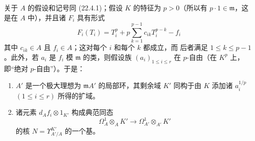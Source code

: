 \begin{proposition}[22.4.4]
\label{0.22.4.4-fr}
关于 $A$ 的假设和记号同 (22.4.1)；假设 $K$ 的特征为 $p>0$（所以有
$p\cdot1\in\mathfrak m$，这是在 $A$ 中），并且诸 $F_i$ 具有形式
\begin{equation}
\label{0.22.4.4.1-fr}
  F_i(T_i)=T_i^p+p\sum_{k=1}^{p-1}c_{ik}T_i^{p-k}-f_i
  \tag{22.4.4.1}
\end{equation}
其中 $c_{ik}\in A$ 且 $f_i\in A$；这对每个 $i$ 和每个 $k$ 都成立，而
后者满足 $1\leqslant k\leqslant p-1$。此外，若 $a_i$ 是 $f_i$ 模
$\mathfrak m$ 的类，则假设族 $(a_i)_{1\leqslant i\leqslant r}$ 在
$p$-自由（在 $K^p$ 上，即“绝对 $p$-自由”）。于是：
\begin{enumerate}
  \item[(i)] $A'$ 是一个极大理想为 $\mathfrak mA'$ 的局部环，其剩余域
  $K'$ 同构于由 $K$ 添加诸 $a_i^{1/p}$
  $(1\leqslant i\leqslant r)$ 所得的扩域。


  \item[(ii)] 诸元素 $d_Af_i\otimes1_{K'}$ 构成典范同态
  \[
    \Omega^1_A\otimes_AK'\longrightarrow
    \Omega^1_{A'}\otimes_{A'}K'
  \]
  的核 $N=\Upsilon^{K'}_{A'/A}$ 的一个基。
\end{enumerate}
\end{proposition}

